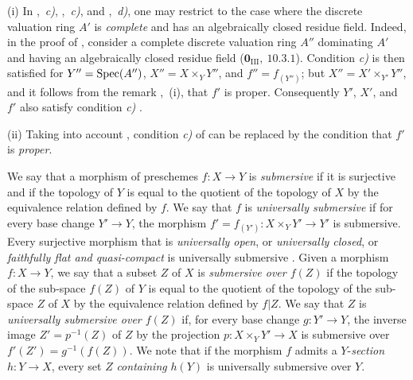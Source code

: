 \begin{remarks}[15.7.7]
\label{IV.15.7.7}
(i)
In ,~\emph{c)}, ,~\emph{c)}, and ,~\emph{d)}, one may restrict to the case where the discrete valuation ring $A'$ is \emph{complete} and has an algebraically closed residue field.
Indeed, in the proof of , consider a complete discrete valuation ring $A''$ dominating $A'$ and having an algebraically closed residue field ($\mathbf{0}_{\mathrm{III}},~10.3.1$). Condition \emph{c)} is then satisfied for $Y''=\operatorname{Spec}(A'')$, $X''=X\times_Y Y''$, and $f''=f_{(Y'')}$; but $X''=X'\times_{Y'}Y''$, and it follows from the remark ,~(i), that $f'$ is proper. Consequently $Y'$, $X'$, and $f'$ also satisfy condition \emph{c)} .

(ii)
Taking into account , condition \emph{c)} of  can be replaced by the condition that $f'$ is \emph{proper}.
\end{remarks}

\begin{env}[15.7.8]
\label{IV.15.7.8}
We say that a morphism of preschemes $f:X\to Y$ is \emph{submersive} if it is surjective and if the topology of $Y$ is equal to the quotient of the topology of $X$ by the equivalence relation defined by $f$.
We say that $f$ is \emph{universally submersive} if for every base change $Y'\to Y$, the morphism $f'=f_{(Y')}:X\times_Y Y'\to Y'$ is submersive.
Every surjective morphism that is \emph{universally open}, or \emph{universally closed}, or \emph{faithfully flat and quasi-compact} is universally submersive .
Given a morphism $f:X\to Y$, we say that a subset $Z$ of $X$ is \emph{submersive over $f(Z)$} if the topology of the sub-space $f(Z)$ of $Y$ is equal to the quotient of the topology of the sub-space $Z$ of $X$ by the equivalence relation defined by $f|Z$.
We say that $Z$ is \emph{universally submersive over $f(Z)$} if, for every base change $g:Y'\to Y$, the inverse image $Z'=p^{-1}(Z)$ of $Z$ by the projection $p:X\times_Y Y'\to X$ is submersive over $f'(Z')=g^{-1}(f(Z))$.
We note that if the morphism $f$ admits a $Y$-\emph{section} $h:Y\to X$, every set $Z$ \emph{containing} $h(Y)$ is universally submersive over $Y$.
\end{env}

